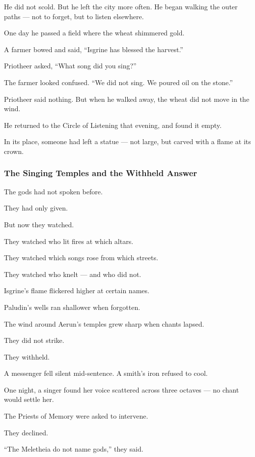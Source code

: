 \documentclass[12pt]{article}
\begin{document}
He did not scold.  
But he left the city more often.  
He began walking the outer paths — not to forget, but to listen elsewhere.

One day he passed a field where the wheat shimmered gold.  

A farmer bowed and said, “Isgrine has blessed the harvest.”

Priotheer asked,  
“What song did you sing?”

The farmer looked confused.  
“We did not sing. We poured oil on the stone.”

Priotheer said nothing.  
But when he walked away, the wheat did not move in the wind.

He returned to the Circle of Listening that evening, and found it empty.

In its place, someone had left a statue — not large,  
but carved with a flame at its crown.

\dotfill

\subsubsection{The Singing Temples and the Withheld Answer}

The gods had not spoken before.

They had only given.

But now they watched.

They watched who lit fires at which altars.  

They watched which songs rose from which streets.  

They watched who knelt — and who did not.

Isgrine’s flame flickered higher at certain names.  

Paludin’s wells ran shallower when forgotten. 

The wind around Aerun’s temples grew sharp when chants lapsed.

They did not strike.  

They withheld.

A messenger fell silent mid-sentence.  
A smith’s iron refused to cool.  

One night, a singer found her voice scattered across three octaves — no chant would settle her.

The Priests of Memory were asked to intervene. 

They declined.  

 “The Meletheia do not name gods,” they said. 
 
\end{document}
